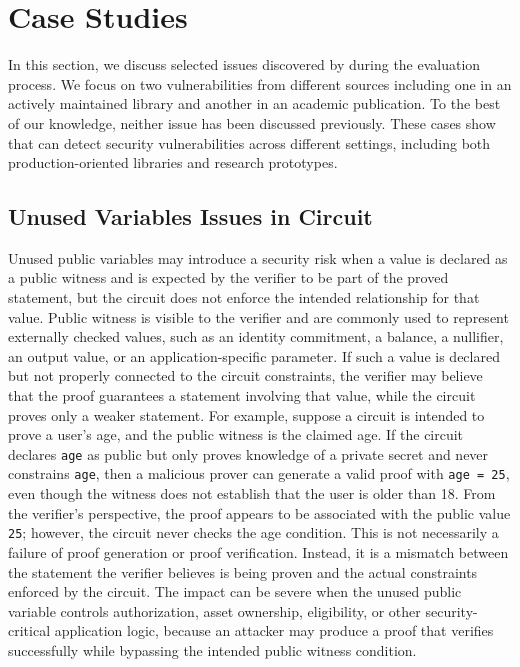 \section{Case Studies}
\label{sec:greybox-discussion}

In this section, we discuss selected issues discovered by \greyboxfuzz during the evaluation process. We focus on two vulnerabilities from different sources including one in an actively maintained \zksnark library and another in an academic publication. To the best of our knowledge, neither issue has been discussed previously. These cases show that \greyboxfuzz can detect security vulnerabilities across different \zksnark settings, including both production-oriented libraries and research prototypes.


\subsection{Unused Variables Issues in Circuit}

Unused public variables may introduce a security risk when a value is declared as a public witness and is expected by the verifier to be part of the proved statement, but the circuit does not enforce the intended relationship for that value. Public witness is visible to the verifier and are commonly used to represent externally checked values, such as an identity commitment, a balance, a nullifier, an output value, or an application-specific parameter. If such a value is declared but not properly connected to the circuit constraints, the verifier may believe that the proof guarantees a statement involving that value, while the circuit proves only a weaker statement. For example, suppose a circuit is intended to prove a user's age, and the public witness is the claimed age. If the circuit declares \texttt{age} as public but only proves knowledge of a private secret and never constrains \texttt{age}, then a malicious prover can generate a valid proof with \texttt{age = 25}, even though the witness does not establish that the user is older than 18. From the verifier's perspective, the proof appears to be associated with the public value \texttt{25}; however, the circuit never checks the age condition. This is not necessarily a failure of proof generation or proof verification. Instead, it is a mismatch between the statement the verifier believes is being proven and the actual constraints enforced by the circuit. The impact can be severe when the unused public variable controls authorization, asset ownership, eligibility, or other security-critical application logic, because an attacker may produce a proof that verifies successfully while bypassing the intended public witness condition.


